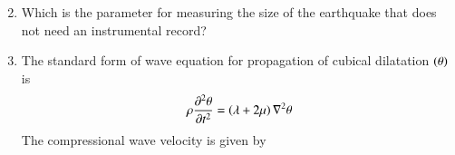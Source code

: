 \documentclass[journal,12pt,onecolumn]{IEEEtran}
\theoremstyle{remark}
\begin{document}
\begin{enumerate}[start = 21]
\begin{multicols}{2}
        \end{multicols}
            \begin {enumerate}
            \end{enumerate}
    \item Which is the parameter for measuring the size of the earthquake that does not need an instrumental record? \hfill{} 
            \begin {enumerate}
            \end{enumerate}  
    \item The standard form of wave equation for propagation of cubical dilatation $\left(\theta\right)$ is \hfill{} 
    $$\rho\frac{\partial^2\theta}{\partial t^2} = \left(\lambda + 2\mu \right)\nabla^2\theta$$
    The compressional wave velocity is given by 
   
    
            \begin {enumerate}
            \end{enumerate}


\end{enumerate}
\end{document}
